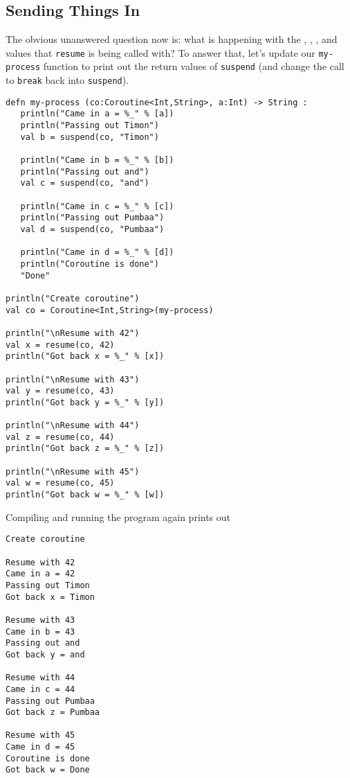 \documentclass[10pt,oneside]{book}
\begin{document}
\subsection*{Sending Things In}
The obvious unanswered question now is: what is happening with the \texttt{}, \texttt{}, \texttt{}, and \texttt{} values that \texttt{\frenchspacing resume} is being called with? To answer that, let's update our \texttt{\frenchspacing my-process} function to print out the return values of \texttt{\frenchspacing suspend} (and change the call to \texttt{\frenchspacing break} back into \texttt{\frenchspacing suspend}). 
\begin{lstlisting}
defn my-process (co:Coroutine<Int,String>, a:Int) -> String :
   println("Came in a = %_" % [a])
   println("Passing out Timon")
   val b = suspend(co, "Timon")

   println("Came in b = %_" % [b])
   println("Passing out and")
   val c = suspend(co, "and")

   println("Came in c = %_" % [c])
   println("Passing out Pumbaa")
   val d = suspend(co, "Pumbaa")

   println("Came in d = %_" % [d])
   println("Coroutine is done")
   "Done"

println("Create coroutine")
val co = Coroutine<Int,String>(my-process)

println("\nResume with 42")
val x = resume(co, 42)
println("Got back x = %_" % [x])

println("\nResume with 43")
val y = resume(co, 43)
println("Got back y = %_" % [y])

println("\nResume with 44")
val z = resume(co, 44)
println("Got back z = %_" % [z])

println("\nResume with 45")
val w = resume(co, 45)
println("Got back w = %_" % [w])
\end{lstlisting}
Compiling and running the program again prints out
\begin{lstlisting}
Create coroutine

Resume with 42
Came in a = 42
Passing out Timon
Got back x = Timon

Resume with 43
Came in b = 43
Passing out and
Got back y = and

Resume with 44
Came in c = 44
Passing out Pumbaa
Got back z = Pumbaa

Resume with 45
Came in d = 45
Coroutine is done
Got back w = Done
\end{lstlisting}
\end{document}
